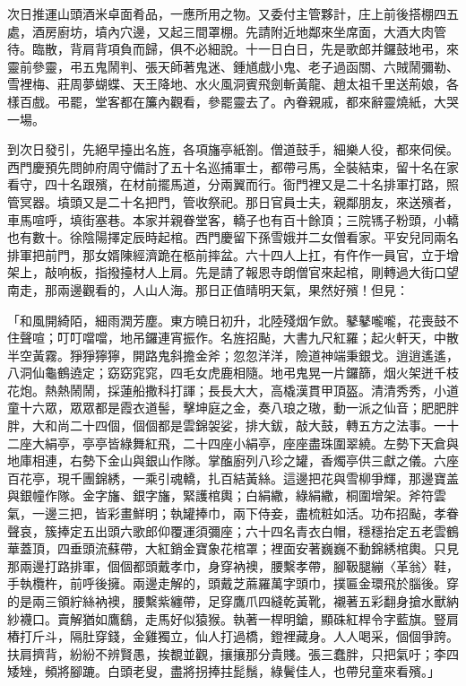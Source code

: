 \begin{showcontents}{}
次日推運山頭酒米卓面肴品，一應所用之物。又委付主管夥計，庄上前後搭棚四五處，酒房廚坊，墳內穴邊，又起三間罩棚。先請附近地鄰來坐席面，大酒大肉管待。臨散，背肩背項負而歸，俱不必細說。十一日白日，先是歌郎并鑼鼓地弔，來靈前參靈，弔五鬼鬧判、張天師著鬼迷、鍾馗戲小鬼、老子過函關、六賊鬧彌勒、雪裡梅、莊周夢蝴蝶、天王降地、水火風洞賓飛劍斬黃龍、趙太祖千里送荊娘，各樣百戲。弔罷，堂客都在簾內觀看，參罷靈去了。內眷親戚，都來辭靈燒紙，大哭一場。

到次日發引，先絕早擡出名旌，各項旛亭紙劄。僧道鼓手，細樂人役，都來伺侯。西門慶預先問帥府周守備討了五十名巡捕軍士，都帶弓馬，全裝結束，留十名在家看守，四十名跟殯，在材前擺馬道，分兩翼而行。衙門裡又是二十名排軍打路，照管冥器。墳頭又是二十名把門，管收祭祀。那日官員士夫，親鄰朋友，來送殯者，車馬喧呼，填街塞巷。本家并親眷堂客，轎子也有百十餘頂；三院駂子粉頭，小轎也有數十。徐陰陽擇定辰時起棺。西門慶留下孫雪娥并二女僧看家。平安兒同兩名排軍把前門，那女婿陳經濟跪在柩前摔盆。六十四人上扛，有仵作一員官，立于增架上，敲响板，指撥擡材人上肩。先是請了報恩寺朗僧官來起棺，剛轉過大街口望南走，那兩邊觀看的，人山人海。那日正值晴明天氣，果然好殯！但見：

「和風開綺陌，細雨潤芳塵。東方曉日初升，北陸殘烟乍歛。鼕鼕嚨嚨，花喪鼓不住聲喧；叮叮噹噹，地吊鑼連宵振作。名旌招颭，大書九尺紅羅；起火軒天，中散半空黃霧。猙猙獰獰，開路鬼斜擔金斧；忽忽洋洋，險道神端秉銀戈。逍逍遙遙，八洞仙龜鶴遶定；窈窈窕窕，四毛女虎鹿相隨。地弔鬼晃一片鑼篩，烟火架迸千枝花炮。熱熱鬧鬧，採蓮船撒科打諢；長長大大，高橇漢貫甲頂盔。清清秀秀，小道童十六眾，眾眾都是霞衣道髻，擊坤庭之金，奏八琅之璈，動一派之仙音；肥肥胖胖，大和尚二十四個，個個都是雲錦袈娑，排大鈸，敲大鼓，轉五方之法事。一十二座大絹亭，亭亭皆綠舞紅飛，二十四座小絹亭，座座盡珠圍翠繞。左勢下天倉與地庫相連，右勢下金山與銀山作隊。掌醢廚列八珍之罐，香燭亭供三獻之儀。六座百花亭，現千團錦綉，一乘引魂轎，扎百結黃絲。這邊把花與雪柳爭輝，那邊寶盖與銀幢作隊。金字旛、銀字旛，緊護棺輿；白絹繖，綠絹繖，桐圍增架。斧符雲氣，一邊三把，皆彩畫鮮明；執罐捧巾，兩下侍妾，盡梳粧如活。功布招颭，孝眷聲哀，簇捧定五出頭六歌郎仰覆運須彌座；六十四名青衣白帽，穩穩抬定五老雲鶴華蓋頂，四垂頭流蘇帶，大紅銷金寶象花棺罩；裡面安著巍巍不動錦綉棺輿。只見那兩邊打路排軍，個個都頭戴孝巾，身穿衲襖，腰繫孝帶，腳靸腿繃〈革翁〉鞋，手執欖杵，前呼後擁。兩邊走解的，頭戴芝蔴羅萬字頭巾，撲匾金環飛於腦後。穿的是兩三領紵絲衲襖，腰繫紫纏帶，足穿鷹爪四縫乾黃靴，襯著五彩翻身搶水獸納紗襪口。賣解猶如鷹鷂，走馬好似猿猴。執著一桿明鎗，顯硃紅桿令字藍旗。豎肩樁打斤斗，隔肚穿錢，金雞獨立，仙人打過橋，鐙裡藏身。人人喝采，個個爭誇。扶肩擠背，紛紛不辨賢愚，挨覩並觀，攘攘那分貴賤。張三蠢胖，只把氣吁；李四矮矬，頻將腳蹗。白頭老叟，盡將拐捧拄髭鬚，綠鬢佳人，也帶兒童來看殯。」


\end{showcontents}
